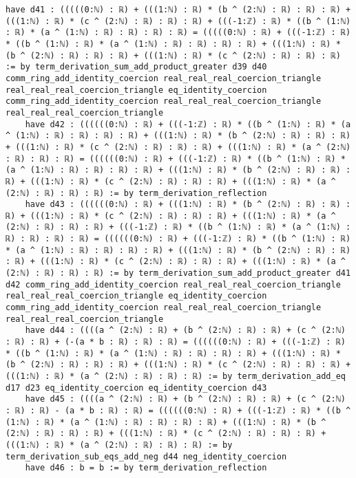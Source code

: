 \documentclass{article}
\begin{document}
\begin{tcolorbox}[colback=white!10, width=\linewidth]
\begin{lstlisting}[language=Lean4]
    have d41 : (((((0:ℕ) : ℝ) + (((1:ℕ) : ℝ) * (b ^ (2:ℕ) : ℝ) : ℝ) : ℝ) + (((1:ℕ) : ℝ) * (c ^ (2:ℕ) : ℝ) : ℝ) : ℝ) + (((-1:ℤ) : ℝ) * ((b ^ (1:ℕ) : ℝ) * (a ^ (1:ℕ) : ℝ) : ℝ) : ℝ) : ℝ) = (((((0:ℕ) : ℝ) + (((-1:ℤ) : ℝ) * ((b ^ (1:ℕ) : ℝ) * (a ^ (1:ℕ) : ℝ) : ℝ) : ℝ) : ℝ) + (((1:ℕ) : ℝ) * (b ^ (2:ℕ) : ℝ) : ℝ) : ℝ) + (((1:ℕ) : ℝ) * (c ^ (2:ℕ) : ℝ) : ℝ) : ℝ) := by term_derivation_sum_add_product_greater d39 d40 comm_ring_add_identity_coercion real_real_real_coercion_triangle real_real_real_coercion_triangle eq_identity_coercion comm_ring_add_identity_coercion real_real_real_coercion_triangle real_real_real_coercion_triangle
    have d42 : ((((((0:ℕ) : ℝ) + (((-1:ℤ) : ℝ) * ((b ^ (1:ℕ) : ℝ) * (a ^ (1:ℕ) : ℝ) : ℝ) : ℝ) : ℝ) + (((1:ℕ) : ℝ) * (b ^ (2:ℕ) : ℝ) : ℝ) : ℝ) + (((1:ℕ) : ℝ) * (c ^ (2:ℕ) : ℝ) : ℝ) : ℝ) + (((1:ℕ) : ℝ) * (a ^ (2:ℕ) : ℝ) : ℝ) : ℝ) = ((((((0:ℕ) : ℝ) + (((-1:ℤ) : ℝ) * ((b ^ (1:ℕ) : ℝ) * (a ^ (1:ℕ) : ℝ) : ℝ) : ℝ) : ℝ) + (((1:ℕ) : ℝ) * (b ^ (2:ℕ) : ℝ) : ℝ) : ℝ) + (((1:ℕ) : ℝ) * (c ^ (2:ℕ) : ℝ) : ℝ) : ℝ) + (((1:ℕ) : ℝ) * (a ^ (2:ℕ) : ℝ) : ℝ) : ℝ) := by term_derivation_reflection
    have d43 : ((((((0:ℕ) : ℝ) + (((1:ℕ) : ℝ) * (b ^ (2:ℕ) : ℝ) : ℝ) : ℝ) + (((1:ℕ) : ℝ) * (c ^ (2:ℕ) : ℝ) : ℝ) : ℝ) + (((1:ℕ) : ℝ) * (a ^ (2:ℕ) : ℝ) : ℝ) : ℝ) + (((-1:ℤ) : ℝ) * ((b ^ (1:ℕ) : ℝ) * (a ^ (1:ℕ) : ℝ) : ℝ) : ℝ) : ℝ) = ((((((0:ℕ) : ℝ) + (((-1:ℤ) : ℝ) * ((b ^ (1:ℕ) : ℝ) * (a ^ (1:ℕ) : ℝ) : ℝ) : ℝ) : ℝ) + (((1:ℕ) : ℝ) * (b ^ (2:ℕ) : ℝ) : ℝ) : ℝ) + (((1:ℕ) : ℝ) * (c ^ (2:ℕ) : ℝ) : ℝ) : ℝ) + (((1:ℕ) : ℝ) * (a ^ (2:ℕ) : ℝ) : ℝ) : ℝ) := by term_derivation_sum_add_product_greater d41 d42 comm_ring_add_identity_coercion real_real_real_coercion_triangle real_real_real_coercion_triangle eq_identity_coercion comm_ring_add_identity_coercion real_real_real_coercion_triangle real_real_real_coercion_triangle
    have d44 : ((((a ^ (2:ℕ) : ℝ) + (b ^ (2:ℕ) : ℝ) : ℝ) + (c ^ (2:ℕ) : ℝ) : ℝ) + (-(a * b : ℝ) : ℝ) : ℝ) = ((((((0:ℕ) : ℝ) + (((-1:ℤ) : ℝ) * ((b ^ (1:ℕ) : ℝ) * (a ^ (1:ℕ) : ℝ) : ℝ) : ℝ) : ℝ) + (((1:ℕ) : ℝ) * (b ^ (2:ℕ) : ℝ) : ℝ) : ℝ) + (((1:ℕ) : ℝ) * (c ^ (2:ℕ) : ℝ) : ℝ) : ℝ) + (((1:ℕ) : ℝ) * (a ^ (2:ℕ) : ℝ) : ℝ) : ℝ) := by term_derivation_add_eq d17 d23 eq_identity_coercion eq_identity_coercion d43
    have d45 : ((((a ^ (2:ℕ) : ℝ) + (b ^ (2:ℕ) : ℝ) : ℝ) + (c ^ (2:ℕ) : ℝ) : ℝ) - (a * b : ℝ) : ℝ) = ((((((0:ℕ) : ℝ) + (((-1:ℤ) : ℝ) * ((b ^ (1:ℕ) : ℝ) * (a ^ (1:ℕ) : ℝ) : ℝ) : ℝ) : ℝ) + (((1:ℕ) : ℝ) * (b ^ (2:ℕ) : ℝ) : ℝ) : ℝ) + (((1:ℕ) : ℝ) * (c ^ (2:ℕ) : ℝ) : ℝ) : ℝ) + (((1:ℕ) : ℝ) * (a ^ (2:ℕ) : ℝ) : ℝ) : ℝ) := by term_derivation_sub_eqs_add_neg d44 neg_identity_coercion
    have d46 : b = b := by term_derivation_reflection

\end{lstlisting}
\end{tcolorbox}
\end{document}
